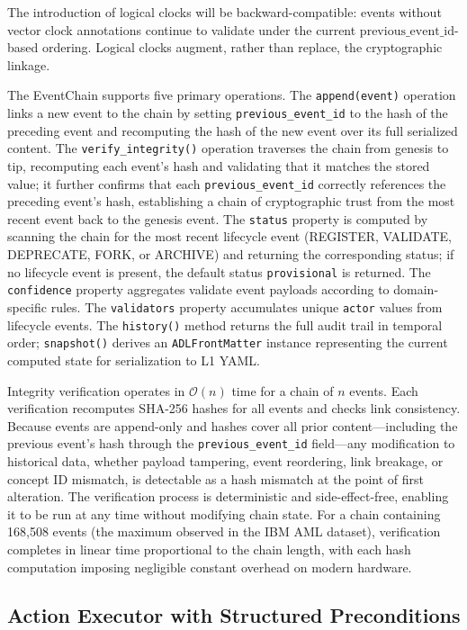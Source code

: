 The introduction of logical clocks will be backward-compatible: events without vector clock annotations continue to validate under the current \(\text{previous\_event\_id}\)-based ordering. Logical clocks augment, rather than replace, the cryptographic linkage.

The EventChain supports five primary operations. The \texttt{append(event)} operation links a new event to the chain by setting \texttt{previous\_event\_id} to the hash of the preceding event and recomputing the hash of the new event over its full serialized content. The \texttt{verify\_integrity()} operation traverses the chain from genesis to tip, recomputing each event's hash and validating that it matches the stored value; it further confirms that each \texttt{previous\_event\_id} correctly references the preceding event's hash, establishing a chain of cryptographic trust from the most recent event back to the genesis event. The \texttt{status} property is computed by scanning the chain for the most recent lifecycle event (REGISTER, VALIDATE, DEPRECATE, FORK, or ARCHIVE) and returning the corresponding status; if no lifecycle event is present, the default status \texttt{provisional} is returned. The \texttt{confidence} property aggregates validate event payloads according to domain-specific rules. The \texttt{validators} property accumulates unique \texttt{actor} values from lifecycle events. The \texttt{history()} method returns the full audit trail in temporal order; \texttt{snapshot()} derives an \texttt{ADLFrontMatter} instance representing the current computed state for serialization to L1 YAML.

Integrity verification operates in \(\mathcal{O}(n)\) time for a chain of \(n\) events. Each verification recomputes SHA-256 hashes for all events and checks link consistency. Because events are append-only and hashes cover all prior content---including the previous event's hash through the \texttt{previous\_event\_id} field---any modification to historical data, whether payload tampering, event reordering, link breakage, or concept ID mismatch, is detectable as a hash mismatch at the point of first alteration. The verification process is deterministic and side-effect-free, enabling it to be run at any time without modifying chain state. For a chain containing 168,508 events (the maximum observed in the IBM AML dataset), verification completes in linear time proportional to the chain length, with each hash computation imposing negligible constant overhead on modern hardware.

\subsection{Action Executor with Structured Preconditions}\label{action-executor-with-structured-preconditions}

